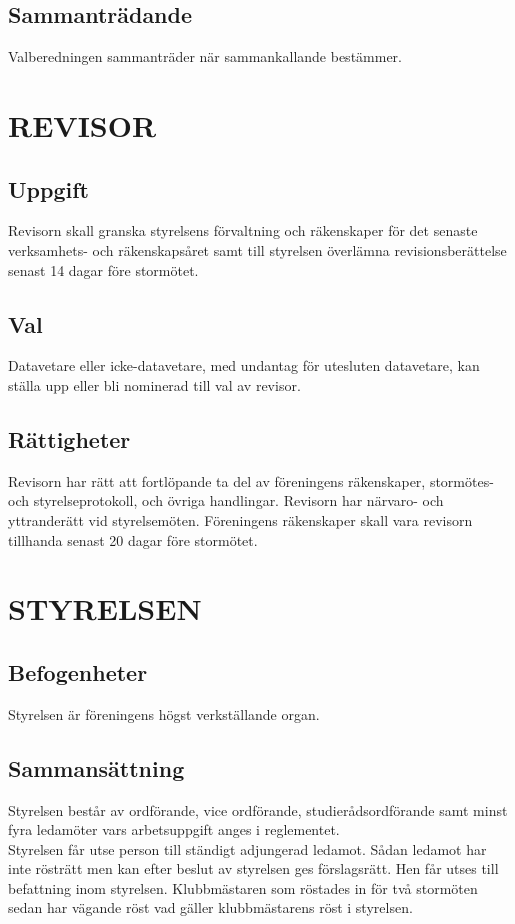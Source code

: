 \documentclass[a4paper]{article}
\begin{document}
{{  \subsection{Sammanträdande}
  Valberedningen sammanträder när sammankallande bestämmer.}
\section{REVISOR}
{\subsection{Uppgift}
  Revisorn skall granska styrelsens förvaltning och räkenskaper för det senaste verksamhets- och räkenskapsåret samt till styrelsen överlämna revisionsberättelse senast 14 dagar före stormötet.
  \subsection{Val}
  Datavetare eller icke-datavetare, med undantag för utesluten datavetare, kan ställa upp eller bli nominerad till val av revisor.
  \subsection{Rättigheter}
  Revisorn har rätt att fortlöpande ta del av föreningens räkenskaper, stormötes- och styrelseprotokoll, och övriga handlingar. Revisorn har närvaro- och yttranderätt vid styrelsemöten. Föreningens räkenskaper skall vara revisorn tillhanda senast 20 dagar före stormötet.}
\section{STYRELSEN}
{\subsection{Befogenheter}
  Styrelsen är föreningens högst verkställande organ.
  \subsection{Sammansättning}
  Styrelsen består av ordförande, vice ordförande, studierådsordförande samt minst fyra ledamöter vars arbetsuppgift anges i reglementet.\\
  Styrelsen får utse person till ständigt adjungerad ledamot. Sådan ledamot har inte rösträtt men kan efter beslut av styrelsen ges förslagsrätt. Hen får utses till befattning inom styrelsen. Klubbmästaren som röstades in för två stormöten sedan har vägande röst vad gäller klubbmästarens röst i styrelsen.
}}
\end{document}
